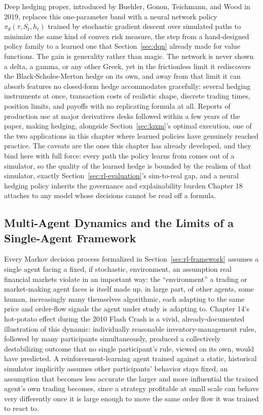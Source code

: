 \documentclass[../ai_in_finance]{subfiles}
\begin{document}
Deep hedging proper, introduced by Buehler, Gonon, Teichmann, and Wood in 2019, replaces this one-parameter band with a neural network policy $\pi_\theta(\tau, S_t, h_t)$ trained by stochastic gradient descent over simulated paths to minimize the same kind of convex risk measure, the step from a hand-designed policy family to a learned one that Section~\ref{sec:dqn} already made for value functions. The gain is generality rather than magic. The network is never shown a delta, a gamma, or any other Greek, yet in the frictionless limit it rediscovers the Black-Scholes-Merton hedge on its own, and away from that limit it can absorb features no closed-form hedge accommodates gracefully: several hedging instruments at once, transaction costs of realistic shape, discrete trading times, position limits, and payoffs with no replicating formula at all. Reports of production use at major derivatives desks followed within a few years of the paper, making hedging, alongside Section~\ref{sec:loxm}'s optimal execution, one of the two applications in this chapter where learned policies have genuinely reached practice. The caveats are the ones this chapter has already developed, and they bind here with full force: every path the policy learns from comes out of a simulator, so the quality of the learned hedge is bounded by the realism of that simulator, exactly Section~\ref{sec:rl-evaluation}'s sim-to-real gap, and a neural hedging policy inherits the governance and explainability burden Chapter 18 attaches to any model whose decisions cannot be read off a formula.

\subsection{Multi-Agent Dynamics and the Limits of a Single-Agent Framework}
\label{sec:rl-multiagent}

Every Markov decision process formalized in Section~\ref{sec:rl-framework} assumes a single agent facing a fixed, if stochastic, environment, an assumption real financial markets violate in an important way: the ``environment'' a trading or market-making agent faces is itself made up, in large part, of other agents, some human, increasingly many themselves algorithmic, each adapting to the same price and order-flow signals the agent under study is adapting to. Chapter 14's hot-potato effect during the 2010 Flash Crash is a vivid, already-documented illustration of this dynamic: individually reasonable inventory-management rules, followed by many participants simultaneously, produced a collectively destabilizing outcome that no single participant's rule, viewed on its own, would have predicted. A reinforcement-learning agent trained against a static, historical simulator implicitly assumes other participants' behavior stays fixed, an assumption that becomes less accurate the larger and more influential the trained agent's own trading becomes, since a strategy profitable at small scale can behave very differently once it is large enough to move the same order flow it was trained to react to.
\end{document}
